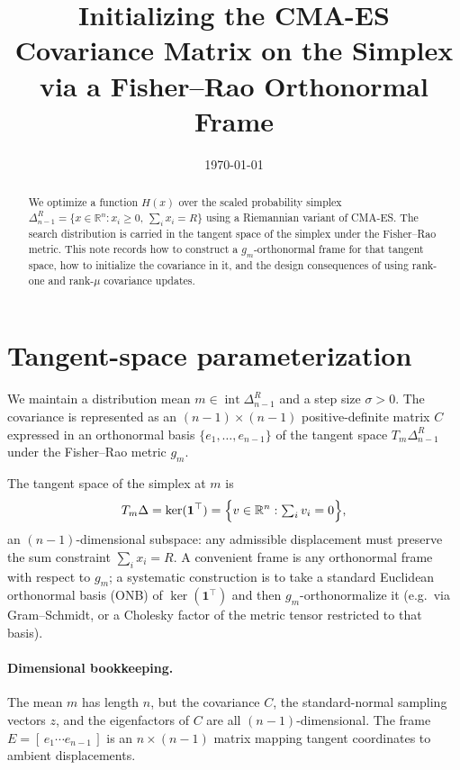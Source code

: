 \documentclass[11pt]{article}
\title{Initializing the CMA-ES Covariance Matrix on the Simplex\\
       via a Fisher--Rao Orthonormal Frame}
\author{}
\date{\today}
\newcommand{\R}{\mathbb{R}}
\newcommand{\one}{\mathbf{1}}
\newcommand{\Tm}{T_m\Delta}
\DeclareMathOperator{\intr}{int}
\begin{document}
\maketitle

\begin{abstract}
We optimize a function $H(x)$ over the scaled probability simplex
$\Delta_{n-1}^{R} = \{x \in \R^n : x_i \ge 0,\ \sum_i x_i = R\}$ using a
Riemannian variant of CMA-ES. The search distribution is carried in the
tangent space of the simplex under the Fisher--Rao metric. This note records
how to construct a $g_m$-orthonormal frame for that tangent space, how to
initialize the covariance in it, and the design consequences of using rank-one
and rank-$\mu$ covariance updates.
\end{abstract}

\section{Tangent-space parameterization}

We maintain a distribution mean $m \in \intr \Delta_{n-1}^{R}$ and a step size
$\sigma > 0$. The covariance is represented as an $(n-1)\times(n-1)$
positive-definite matrix $C$ expressed in an orthonormal basis
$\{e_1, \dots, e_{n-1}\}$ of the tangent space $\Tm_{n-1}^{R}$ under the
Fisher--Rao metric $g_m$.

The tangent space of the simplex at $m$ is
\begin{equation}
  \Tm = \ker(\one^\top) = \Bigl\{ v \in \R^n : \textstyle\sum_i v_i = 0 \Bigr\},
\end{equation}
an $(n-1)$-dimensional subspace: any admissible displacement must preserve the
sum constraint $\sum_i x_i = R$. A convenient frame is any orthonormal frame
with respect to $g_m$; a systematic construction is to take a standard
Euclidean orthonormal basis (ONB) of $\ker(\one^\top)$ and then
$g_m$-orthonormalize it (e.g.\ via Gram--Schmidt, or a Cholesky factor of the
metric tensor restricted to that basis).

\paragraph{Dimensional bookkeeping.} The mean $m$ has length $n$, but the
covariance $C$, the standard-normal sampling vectors $z$, and the eigenfactors
of $C$ are all $(n-1)$-dimensional. The frame $E = [\,e_1 \cdots e_{n-1}\,]$ is
an $n \times (n-1)$ matrix mapping tangent coordinates to ambient
displacements.
\end{document}
